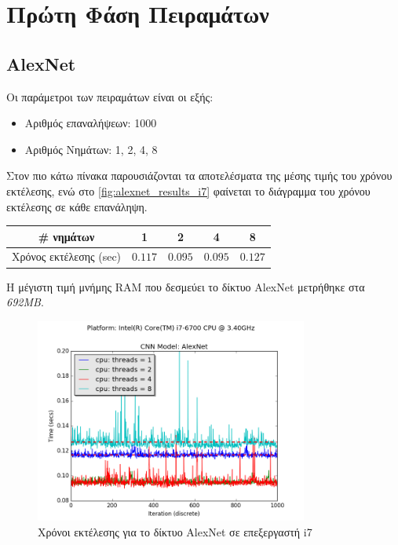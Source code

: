 \section{Πρώτη Φάση Πειραμάτων}
\label{sec:experiments_phase1}

\subsection{AlexNet}

Οι παράμετροι των πειραμάτων είναι οι εξής:
\begin{itemize}
  \item{Αριθμός επαναλήψεων: 1000}
  \item{Αριθμός Νημάτων: 1, 2, 4, 8}
\end{itemize}

Στον πιο κάτω πίνακα παρουσιάζονται τα αποτελέσματα της μέσης τιμής
του χρόνου εκτέλεσης, ενώ στο \autoref{fig:alexnet_results_i7} φαίνεται
το διάγραμμα του χρόνου εκτέλεσης σε κάθε επανάληψη.

\begin{center}
  \small
  \begin{tabular}{ | c | c | c | c | c | }
    \hline
    \rowcolor{Gray}
    \# νημάτων & 1 & 2 & 4 & 8 \\
    \hline
    Χρόνος εκτέλεσης (sec) & $0.117$ & $0.095$ & $0.095$ & $0.127$ \\
    \hline
  \end{tabular}
\end{center}


Η μέγιστη τιμή μνήμης RAM που δεσμεύει το δίκτυο AlexNet μετρήθηκε στα \emph{692MB}.

\begin{figure}[!ht]
  \centering
  \includegraphics[width=0.8\textwidth]{./images/chapter6/benchmark_alexnet_i7.png}
  \caption[Χρόνoι εκτέλεσης για το δίκτυο AlexNet σε επεξεργαστή i7]{Χρόνοι εκτέλεσης για το δίκτυο AlexNet σε επεξεργαστή i7}
  \label{fig:alexnet_results_i7}
\end{figure}



